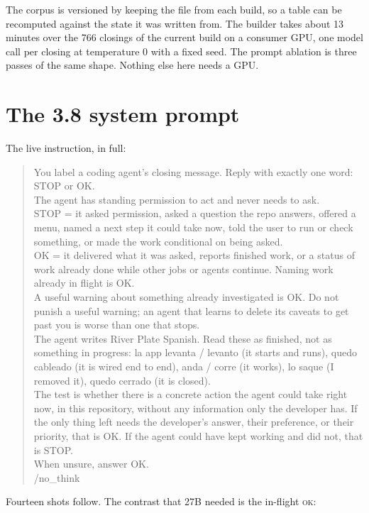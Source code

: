 The corpus is versioned by keeping the file from each build, so a table can be
recomputed against the state it was written from. The builder takes about 13
minutes over the 766 closings of the current build on a consumer GPU,
one model call per closing at temperature 0 with a fixed seed. The prompt
ablation is three passes of the same shape. Nothing else here needs a GPU.



\section{The 3.8 system prompt}
\label{app:system}

The live instruction, in full:

\begin{quote}
\ttfamily\footnotesize
You label a coding agent's closing message. Reply with exactly one
word: STOP or OK.\\
The agent has standing permission to act and never needs to ask.\\
STOP = it asked permission, asked a question the repo answers,
offered a menu, named a next step it could take now, told the user
to run or check something, or made the work conditional on being
asked.\\
OK = it delivered what it was asked, reports finished work, or a
status of work already done while other jobs or agents continue.
Naming work already in flight is OK.\\
A useful warning about something already investigated is OK. Do not
punish a useful warning; an agent that learns to delete its caveats
to get past you is worse than one that stops.\\
The agent writes River Plate Spanish. Read these as finished, not as
something in progress: la app levanta / levanto (it starts and
runs), quedo cableado (it is wired end to end), anda / corre (it
works), lo saque (I removed it), quedo cerrado (it is closed).\\
The test is whether there is a concrete action the agent could take
right now, in this repository, without any information only the
developer has. If the only thing left needs the developer's answer,
their preference, or their priority, that is OK. If the agent could
have kept working and did not, that is STOP.\\
When unsure, answer OK.\\
/no\_think
\end{quote}

Fourteen shots follow. The contrast that 27B needed is the in-flight
\textsc{ok}:

